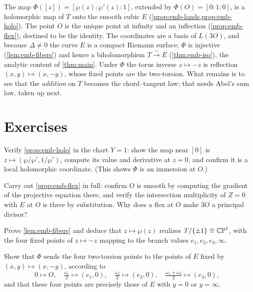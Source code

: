 The map \(\Phi([z]) = [\wp(z):\wp'(z):1]\), extended by \(\Phi(O) = [0:1:0]\), is a
holomorphic map of \(T\) onto the smooth cubic \(E\)
(\cref{prop:emb-lands,prop:emb-holo}). The point \(O\) is the unique point at
infinity and an inflection (\cref{prop:emb-flex}), destined to be the identity.
The coordinates are a basis of \(L(3O)\), and because \(\Delta \ne 0\) the curve
\(E\) is a compact Riemann surface; \(\Phi\) is injective
(\cref{lem:emb-fibers}) and hence a biholomorphism
\(T \xrightarrow{\sim} E\) (\cref{thm:emb-iso}), the analytic content of
\cref{thm:main}. Under \(\Phi\) the torus inverse \(z \mapsto -z\) is reflection
\((x,y) \mapsto (x,-y)\), whose fixed points are the two-torsion. What remains is
to see that the \emph{addition} on \(T\) becomes the chord--tangent law; that
needs Abel's sum law, taken up next.

\section*{Exercises}

\begin{exercise}
\label{ex:emb-holo-origin}
Verify \cref{prop:emb-holo} in the chart \(Y = 1\): show the map near \([0]\) is
\(z \mapsto (\wp/\wp', 1/\wp')\), compute its value and derivative at \(z = 0\),
and confirm it is a local holomorphic coordinate. (This shows \(\Phi\) is an
immersion at \(O\).)
\end{exercise}

\begin{exercise}
\label{ex:emb-flex}
Carry out \cref{prop:emb-flex} in full: confirm \(O\) is smooth by computing the
gradient of the projective equation there, and verify the intersection
multiplicity of \(Z = 0\) with \(E\) at \(O\) is three by substitution. Why does a
flex at \(O\) make \(3O\) a principal divisor?
\end{exercise}

\begin{exercise}
\label{ex:emb-fiber-lemma}
Prove \cref{lem:emb-fibers} and deduce that \(z \mapsto \wp(z)\) realizes
\(T/\{\pm1\} \cong \mathbb{CP}^1\), with the four fixed points of \(z \mapsto -z\) mapping
to the branch values \(e_1, e_2, e_3, \infty\).
\end{exercise}

\begin{exercise}
\label{ex:emb-two-torsion-image}
Show that \(\Phi\) sends the four two-torsion points to the points of \(E\) fixed
by \((x,y) \mapsto (x,-y)\), according to
\[
  0 \mapsto O, \quad
  \tfrac{\omega_1}{2} \mapsto (e_1,0), \quad
  \tfrac{\omega_2}{2} \mapsto (e_2,0), \quad
  \tfrac{\omega_1+\omega_2}{2} \mapsto (e_3,0),
\]
and that these four points are precisely those of \(E\) with \(y = 0\) or
\(y = \infty\).
\end{exercise}

